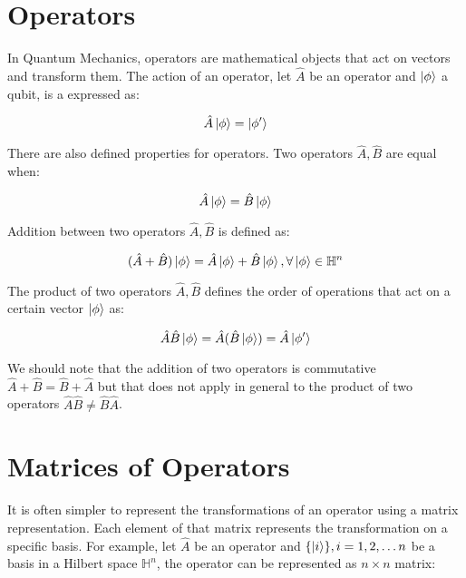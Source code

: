 \section{Operators}

In Quantum Mechanics, operators are mathematical objects that act on vectors and transform them.
The action of an operator, let $\hat{A}$ be an operator and $\ket{\phi}$ a qubit, is a expressed as:

\begin{equation}
    \hat{A}\ket{\phi}=\ket{\phi'}
\end{equation}

There are also defined properties for operators. Two operators $\hat{A},\hat{B}$ are equal when:

\begin{equation}
    \hat{A}\ket{\phi}=\hat{B}\ket{\phi}
\end{equation}

Addition between two operators $\hat{A},\hat{B}$ is defined as:

\begin{equation}
    (\hat{A}+\hat{B})\ket{\phi}=\hat{A}\ket{\phi}+\hat{B}\ket{\phi},\forall\ket{\phi}\in\mathbb{H}^n
\end{equation}

The product of two operators $\hat{A},\hat{B}$ defines the order of operations that act on a certain vector $\ket{\phi}$ as:

\begin{equation}
    \hat{A}\hat{B}\ket{\phi}=\hat{A}(\hat{B}\ket{\phi})=\hat{A}\ket{\phi'}
\end{equation}

We should note that the addition of two operators is commutative $\hat{A}+\hat{B}=\hat{B}+\hat{A}$ but that
does not apply in general to the product of two operators $\hat{A}\hat{B}\neq\hat{B}\hat{A}$.

\section{Matrices of Operators}

It is often simpler to represent the transformations of an operator using a matrix representation. Each element of that
matrix represents the transformation on a specific basis. For example, let $\hat{A}$ be an operator and $\{\ket{i}\},i=1,2,\hdots n$
be a basis in a Hilbert space $\mathbb{H}^n$, the operator can be represented as $n\times n$ matrix:

